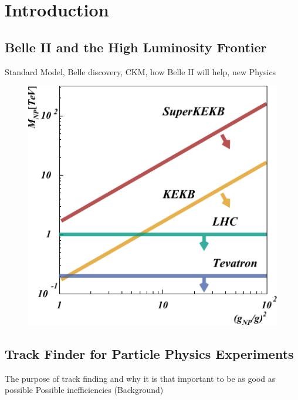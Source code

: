 \chapter{Introduction}
\section{Belle II and the High Luminosity Frontier}
Standard Model, Belle discovery, CKM, how Belle II will help, new Physics

\begin{figure}
  \centering
  \includegraphics[width=0.6\linewidth]{figures/general/luminosity.pdf}
  \caption{\cite{tdr}}
\end{figure}

\section{Track Finder for Particle Physics Experiments}
The purpose of track finding and why it is that important to be as good as possible
Possible inefficiencies (Background)


